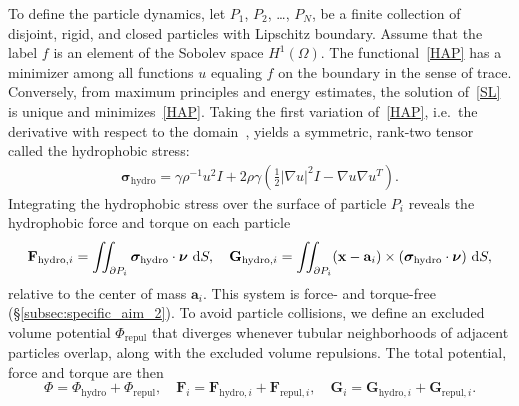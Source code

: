 To define the particle dynamics, let $P_1$, $P_2$, \ldots, $P_N$, be a
finite collection of disjoint, rigid, and closed particles with
Lipschitz boundary. Assume that the label $f$ is an element of the
Sobolev space $H^1(\Omega)$. The functional~\eqref{HAP} has a minimizer
among all functions $u$ equaling $f$ on the boundary in the sense of
trace.  Conversely, from maximum principles and energy estimates, the
solution of~\eqref{SL} is unique and minimizes~\eqref{HAP}. Taking the
first variation of~\eqref{HAP}, i.e.~the derivative with respect to the
domain~\cite{Bandle2015, Schiffer1954, Grinfeld2010}, yields a
symmetric, rank-two tensor called the hydrophobic stress:
\begin{align}
  \label{stress}
\boldsymbol{\sigma}_{\text{hydro}} = \gamma \rho^{-1} u^2 I + 2\rho \gamma (\tfrac{1}{2}|\nabla u|^2I - \nabla u \nabla u^T).
\end{align}
%
%
Integrating the hydrophobic stress over the surface of particle $P_i$
reveals the hydrophobic force and torque on each particle 
\begin{align}
  \label{forceandtorque}
  \mathbf{F}_{\text{hydro},i} = \iint_{\partial P_i} \boldsymbol{\sigma}_{\text{hydro}}
  \cdot \boldsymbol{\nu} \,\dif S,\quad
  \mathbf{G}_{\text{hydro},i} = \iint_{\partial P_i} (\mathbf{x}-\mathbf{a}_i) \times
  (\boldsymbol{\sigma}_{\text{hydro}} \cdot \boldsymbol{\nu}) \,\dif S,
\end{align}
relative to the center of mass $\mathbf{a}_i$.  This system is force-
and torque-free (\S\ref{subsec:specific_aim_2}).  To avoid particle
collisions, we define an excluded volume potential $\Phi_{\text{repul}}$
that diverges whenever tubular neighborhoods of adjacent particles
overlap, along with the excluded volume repulsions. The total potential,
force and torque are then
\begin{equation}
\label{eq:total_poten}
\Phi = \Phi_{\text{hydro}} + \Phi_{\text{repul}},\quad
\mathbf{F}_{i} = \mathbf{F}_{\text{hydro},i} + \mathbf{F}_{\text{repul},i},\quad
\mathbf{G}_{i} = \mathbf{G}_{\text{hydro},i} + \mathbf{G}_{\text{repul},i}.
\end{equation}

